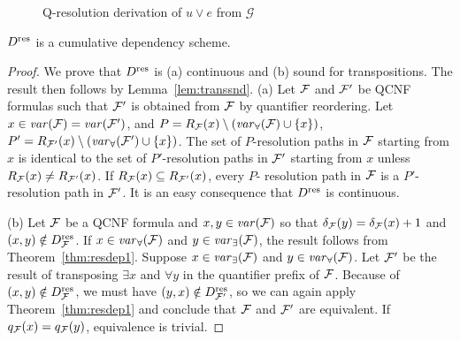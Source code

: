 \documentclass{llncs}
\newcommand{\longversion}[1]{#1}
\newcommand{\shortversion}[1]{}
\newcommand{\GGG}{\mathcal{G}} \newcommand{\HHH}{\mathcal{H}}
\newcommand{\Dres}{D^{\text{\normalfont res}}}
\def\hy{\hbox{-}\nobreak\hskip0pt} \newcommand{\ellipsis}{$\dots$}
\begin{document}
\shortversion{\begin{figure}[b]}
\longversion{\begin{figure}}
\begin{center}
\end{center}
\caption{Q\hy resolution derivation of $u \vee e$ from $\GGG$} 
\label{fig:resolutionderivation}
\end{figure}
\begin{theorem}\label{thm:DresDep}
  $\Dres$ is a cumulative dependency scheme.
\end{theorem}
\begin{proof} We prove that $\Dres$ is (a) continuous and (b) sound for
  transpositions. The result then follows by Lemma~\ref{lem:transsnd}. (a) Let
  $\mathcal{F}$ and $\mathcal{F}'$ be QCNF formulas such that $\mathcal{F}'$ is obtained from
  $\mathcal{F}$ by quantifier reordering. Let $x \in \mathit{var}(\mathcal{F}) = \mathit{var}(\mathcal{F}')$, and
  $P = R_{\mathcal{F}}(x) \setminus (\mathit{var}_{\forall}(\mathcal{F}) \cup \{x\})$, $P' =
  R_{\mathcal{F}'}(x) \setminus (\mathit{var}_{\forall}(\mathcal{F}') \cup \{x\})$. The set of
  $P$\hy resolution paths in $\mathcal{F}$ starting from $x$ is identical to the set
  of $P'$\hy resolution paths in $\mathcal{F}'$ starting from $x$ unless $R_{\mathcal{F}}(x)
  \neq R_{\mathcal{F}'}(x)$. If $R_{\mathcal{F}}(x) \subseteq R_{\mathcal{F}'}(x)$, every $P$\hy
  resolution path in $\mathcal{F}$ is a $P'$\hy resolution path in $\mathcal{F}'$. It is an
  easy consequence that $\Dres$ is continuous.

  (b) Let $\mathcal{F}$ be a QCNF formula and $x,y \in \mathit{var}(\mathcal{F})$ so that
  $\delta_{\mathcal{F}}(y) = \delta_{\mathcal{F}}(x) + 1$ and $(x,y) \notin
  \Dres_{\FFF}$. If $x \in \mathit{var}_{\forall}(\mathcal{F})$ and $y \in
  \mathit{var}_{\exists}(\mathcal{F})$, the result follows from
  Theorem~\ref{thm:resdep1}. Suppose $x \in \mathit{var}_{\exists}(\mathcal{F})$ and $y \in
  \mathit{var}_{\forall}(\mathcal{F})$. Let $\mathcal{F}'$ be the result of transposing $\exists x$
  and $\forall y$ in the quantifier prefix of $\mathcal{F}$. Because of $(x,y) \notin
  \Dres_{\FFF}$, we must have $(y,x) \notin \Dres_{\FFF'}$, so we can again
  apply Theorem~\ref{thm:resdep1} and conclude that $\mathcal{F}$ and $\mathcal{F}'$ are
  equivalent. If $q_{\mathcal{F}}(x) = q_{\mathcal{F}}(y)$, equivalence is trivial.
\end{proof}
\end{document}
